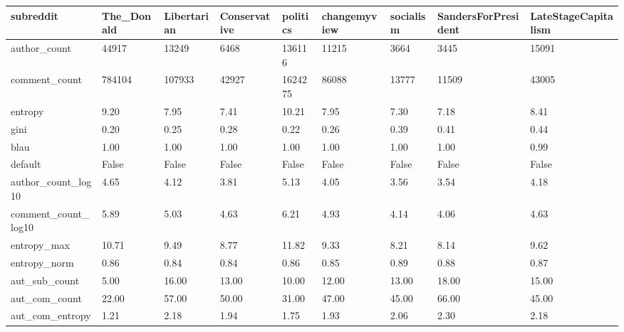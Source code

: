 \begin{table}
\centering
\begin{tabular}{lllllllll}
\toprule
subreddit & The\_Donald & Libertarian & Conservative & politics & changemyview & socialism & SandersForPresident & LateStageCapitalism \\
\midrule
author\_count        &      44917 &       13249 &         6468 &   136116 &        11215 &      3664 &                3445 &               15091 \\
comment\_count       &     784104 &      107933 &        42927 &  1624275 &        86088 &     13777 &               11509 &               43005 \\
entropy             &       9.20 &        7.95 &         7.41 &    10.21 &         7.95 &      7.30 &                7.18 &                8.41 \\
gini                &       0.20 &        0.25 &         0.28 &     0.22 &         0.26 &      0.39 &                0.41 &                0.44 \\
blau                &       1.00 &        1.00 &         1.00 &     1.00 &         1.00 &      1.00 &                1.00 &                0.99 \\
default             &      False &       False &        False &    False &        False &     False &               False &               False \\
author\_count\_log10  &       4.65 &        4.12 &         3.81 &     5.13 &         4.05 &      3.56 &                3.54 &                4.18 \\
comment\_count\_log10 &       5.89 &        5.03 &         4.63 &     6.21 &         4.93 &      4.14 &                4.06 &                4.63 \\
entropy\_max         &      10.71 &        9.49 &         8.77 &    11.82 &         9.33 &      8.21 &                8.14 &                9.62 \\
entropy\_norm        &       0.86 &        0.84 &         0.84 &     0.86 &         0.85 &      0.89 &                0.88 &                0.87 \\
aut\_sub\_count       &       5.00 &       16.00 &        13.00 &    10.00 &        12.00 &     13.00 &               18.00 &               15.00 \\
aut\_com\_count       &      22.00 &       57.00 &        50.00 &    31.00 &        47.00 &     45.00 &               66.00 &               45.00 \\
aut\_com\_entropy     &       1.21 &        2.18 &         1.94 &     1.75 &         1.93 &      2.06 &                2.30 &                2.18 \\

\end{tabular}
\end{table}
